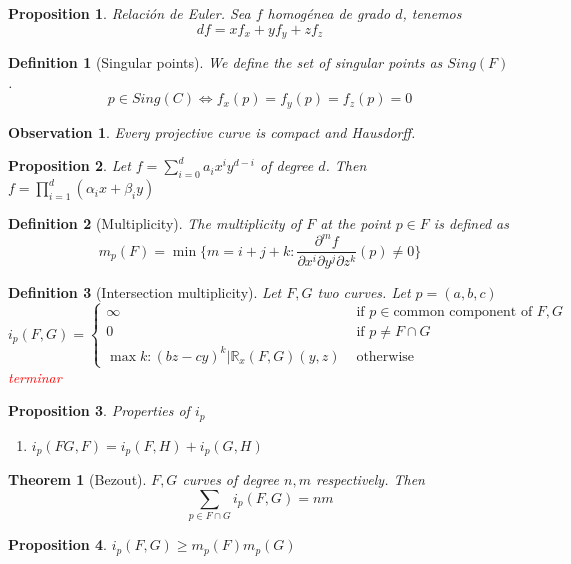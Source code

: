 \documentclass[leqno]{article}
\newtheorem*{theorem}{Theorem}
\newtheorem*{proposition}{Proposition}
\newtheorem*{definition}{Definition}
\newtheorem*{observation}{Observation}
\newcommand{\com}[1]{\textcolor{red}{#1}}
\begin{document}
\begin{proposition}
Relación de Euler. Sea $f$ homogénea de grado $d$, tenemos
 \[
df = xf_x + y f_y + zf_z
\] 
\end{proposition}

\begin{definition}[Singular points] We define the set of singular points as $Sing(F)$.
  \[
	p \in Sing(C) \iff f_x(p) = f_y (p)=f_z(p)=0
  \] 
\end{definition}

\begin{observation} Every projective curve is compact and Hausdorff.
\end{observation}

\begin{proposition} Let $f = \sum_{i=0}^{d} a_ix^iy ^{d-i}$ of degree $d$. Then  $f = \prod _{i=1}^d  (\alpha_i x + \beta _i y)$
\end{proposition}

\begin{definition}[Multiplicity] The multiplicity of $F$ at the point  $p\in F$ is defined as
  \[
	m_p(F) = \min \{m = i+j+k : \frac{\partial^m f}{\partial x^i\partial y^j \partial z^k}(p)\neq 0\}
  \] 
\end{definition}

\begin{definition}[Intersection multiplicity] Let $F, G$ two curves. Let $p = (a, b, c)$
  \[
  i_p(F, G)  = \begin{cases}
	\infty & \text{ if } p \in \text{common component of } F, G\\
	0 & \text{ if } p\neq F\cap G\\
	\max  k : (bz-cy)^k | \mathbb{R}_{x}(F, G)(y, z) & \text{ otherwise}
  \end{cases}
  \] 
  \com{terminar}
\end{definition}

\begin{proposition} Properties of $i_p$ 
  \begin{enumerate}[topsep=-6pt, itemsep=0pt]
    \item $i_p(FG, F) = i_p(F, H) + i_p(G, H)$
  \end{enumerate}
\end{proposition}

\begin{theorem}[Bezout] $F, G$ curves of degree  $n, m$ respectively. Then
   \[
  \sum_{p\in F \cap G} i_p(F, G) = nm
  \] 
\end{theorem}

\begin{proposition} $i_p(F, G)\ge m_p(F)m_p(G)$
\end{proposition}
\end{document}

